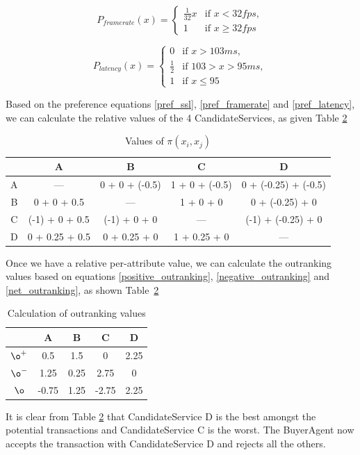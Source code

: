 \documentclass[10pt,journal,compsoc]{IEEEtran}
\begin{document}
	\begin{equation}
		P_{framerate}(x) = \begin{cases} \frac{1}{32}x &\mbox{if } x < 32fps,\\ 
										1 &\mbox{if } x \geq 32fps \end{cases}
			\label{pref_framerate}										
	\end{equation}
	
	\begin{equation}
		P_{latency}(x) = \begin{cases} 0 &\mbox{if } x > 103ms,\\ 
									   \frac{1}{2}	 &\mbox{if } 103 > x > 95ms, \\
										1 &\mbox{if } x \leq 95 \end{cases}
			\label{pref_latency}
	\end{equation}
	
Based on the preference equations \ref{pref_ssl}, \ref{pref_framerate} and \ref{pref_latency}, we can calculate the relative values of the 4 CandidateServices, as given Table \ref{tbl:outranking_table}
	\begin{table}[htbp]
		\centering
		\caption{Values of $\pi(x_i, x_j)$ \label{tbl_ranking_values}}
		\begin{tabular}{c|cccc}
		\toprule
		  & A & B & C & D \\
		\midrule
		A & --- & 0 + 0 + (-0.5) & 1 + 0 + (-0.5) & 0 + (-0.25) + (-0.5) \\
		B & 0 + 0 + 0.5 & --- & 1 + 0 + 0 & 0 + (-0.25) + 0 \\
		C & (-1) + 0 + 0.5 & (-1) + 0 + 0 & --- & (-1) + (-0.25) + 0 \\
		D & 0 + 0.25 + 0.5 & 0 + 0.25 + 0 & 1 + 0.25 + 0 & --- \\
		\bottomrule
		\end{tabular}
	\end{table}
Once we have a relative per-attribute value, we can calculate the outranking values based on equations \ref{positive_outranking}, \ref{negative_outranking} and \ref{net_outranking}, as shown Table~\ref{tbl:outranking_table}

	\begin{table}[htbp]
		\centering
		\renewcommand{\arraystretch}{1.5}
		\begin{tabular}{c|cccc}
		\toprule
		   			& A & B & C & D \\
		\midrule
			$\o^{+}$	& 0.5 & 1.5 & 0 & 2.25 \\
			$\o^{-}$	& 1.25 & 0.25 & 2.75 & 0 \\
			\hline
			$\o$		& -0.75 & 1.25 & -2.75 & 2.25 \\
		\bottomrule
		\end{tabular}			
		\caption{Calculation of outranking values \label{tbl:outranking_table}}
	\end{table}
It is clear from Table \ref{tbl:outranking_table} that CandidateService D is the best amongst the potential transactions and CandidateService C is the worst. The BuyerAgent now accepts the transaction with CandidateService D and rejects all the others. 
\end{document}
